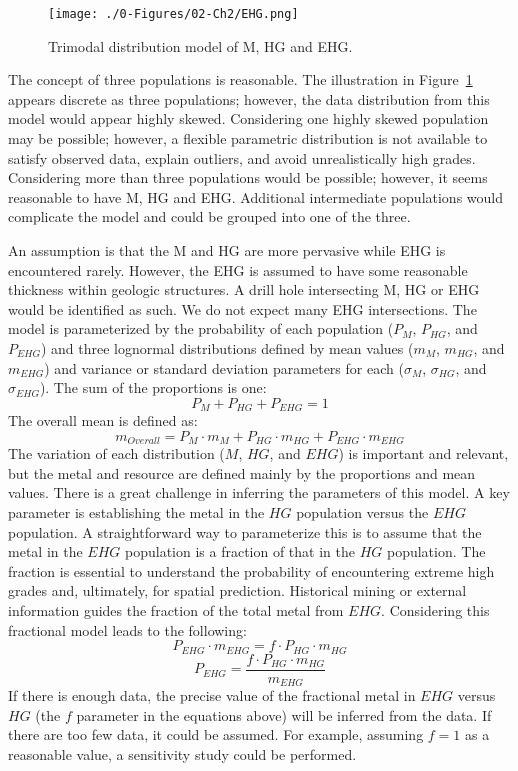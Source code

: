 \begin{figure}[htb!]
    \centering
    \texttt{[image: ./0-Figures/02-Ch2/EHG.png]}
    \caption{Trimodal distribution model of \acrfull{M}, \acrfull{HG} and \acrfull{EHG}.}
    \label{fig:ehg}
\end{figure}

The concept of three populations is reasonable. The illustration in Figure~\ref{fig:ehg} appears discrete as three populations; however, the data distribution from this model would appear highly skewed. Considering one highly skewed population may be possible; however, a flexible parametric distribution is not available to satisfy observed data, explain outliers, and avoid unrealistically high grades. Considering more than three populations would be possible; however, it seems reasonable to have \gls{M}, \gls{HG} and \gls{EHG}. Additional intermediate populations would complicate the model and could be grouped into one of the three.

An assumption is that the \gls{M} and \gls{HG} are more pervasive while \gls{EHG} is encountered rarely. However, the \gls{EHG} is assumed to have some reasonable thickness within geologic structures. A drill hole intersecting \gls{M}, \gls{HG} or \gls{EHG} would be identified as such. We do not expect many \gls{EHG} intersections. The model is parameterized by the probability of each population ($P_{M}$, $P_{HG}$, and $P_{EHG}$) and three lognormal distributions defined by mean values ($m_{M}$, $m_{HG}$, and $m_{EHG}$) and variance or standard deviation parameters for each ($\sigma_{M}$, $\sigma_{HG}$, and $\sigma_{EHG}$). The sum of the proportions is one:
\[
    P_{M} + P_{HG} + P_{EHG}= 1
\]
The overall mean is defined as:
\[
    m_{Overall} = P_{M} \cdot m_{M}  + P_{HG} \cdot m_{HG} + P_{EHG} \cdot m_{EHG}
\]
The variation of each distribution ($M$, $HG$, and $EHG$) is important and relevant, but the metal and resource are defined mainly by the proportions and mean values. There is a great challenge in inferring the parameters of this model. A key parameter is establishing the metal in the $HG$ population versus the $EHG$ population. A straightforward way to parameterize this is to assume that the metal in the $EHG$ population is a fraction of that in the $HG$ population. The fraction is essential to understand the probability of encountering extreme high grades and, ultimately, for spatial prediction. Historical mining or external information guides the fraction of the total metal from $EHG$. Considering this fractional model leads to the following:
\[
    P_{EHG} \cdot m_{EHG} = f \cdot P_{HG} \cdot m_{HG}
\]
\[
    P_{EHG} = \frac{f \cdot P_{HG} \cdot m_{HG}}{m_{EHG}}
\]
If there is enough data, the precise value of the fractional metal in $EHG$ versus $HG$ (the $f$ parameter in the equations above) will be inferred from the data. If there are too few data, it could be assumed. For example, assuming $f=1$ as a reasonable value, a sensitivity study could be performed.

